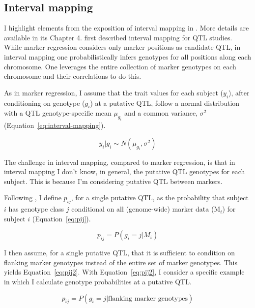 \documentclass[oneside]{book}\usepackage[]{graphicx}\usepackage[]{color}
\begin{document}
\subsection{Interval mapping}\label{sec:interval-mapping}

I highlight elements from the exposition of interval mapping in \citet{broman2009guide}. 
More details are available in its Chapter 4. \citet{lander1989mapping} first described interval 
mapping for QTL studies. While marker 
regression considers only marker positions as candidate QTL, in interval mapping 
one probabilistically infers genotypes for all positions
along each chromosome. One leverages the entire collection of marker genotypes on each 
chromosome and their correlations to do this. 

As in marker regression, I assume that the trait values for each subject ($y_i$), after conditioning on 
genotype ($g_i$) at a putative QTL, follow
a normal distribution with a QTL genotype-specific mean $\mu_{g_i}$ and a common variance, $\sigma^2$ (Equation~\ref{eq:interval-mapping}).

\begin{equation}
y_i | g_i \sim N(\mu_{g_i}, \sigma^2)
\label{eq:interval-mapping}
\end{equation}

The challenge in interval mapping, compared to marker regression, is that in interval mapping I don't know, in general, the putative QTL genotypes for each subject. This is because I'm considering putative QTL between markers.

Following \citet{broman2009guide}, I define $p_{ij}$, for a single putative QTL, as the probability that subject $i$ has genotype class $j$ conditional on all (genome-wide) marker data (M$_i$) for subject $i$ (Equation~\ref{eq:pij}).

\begin{equation}
p_{ij} = P(g_i = j | M_i)
\label{eq:pij}
\end{equation}

I then assume, for a single putative QTL, that it is sufficient to condition on flanking marker genotypes instead of the entire set of marker genotypes. This yields Equation~\ref{eq:pij2}. With Equation~\ref{eq:pij2}, I consider a specific example in which I calculate genotype probabilities at a putative QTL.

\begin{equation}
p_{ij} = P(g_i = j | \text{flanking marker genotypes})
\label{eq:pij2}
\end{equation}
\end{document}
